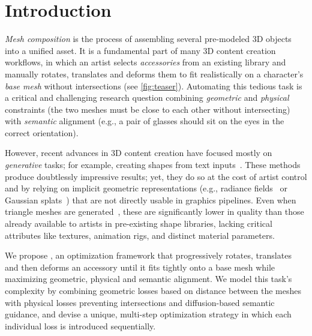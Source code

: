 \section{Introduction} \label{sec:introduction}

\emph{Mesh composition} is the process of assembling several pre-modeled 3D objects into a unified asset.
It is a fundamental part of many 3D content creation workflows, in which an artist selects \emph{accessories} from an existing library and manually rotates, translates and deforms them to fit realistically on a character's \emph{base mesh} without intersections (see \autoref{fig:teaser}).
Automating this tedious task is a critical and challenging research question combining \emph{geometric} and \emph{physical} constraints (the two meshes must be close to each other without intersecting) with \emph{semantic} alignment (e.g., a pair of glasses should sit on the eyes in the correct orientation).





However, recent advances in 3D content creation have focused mostly on \emph{generative} tasks; for example, creating shapes from text inputs~\cite{lin2023magic3d}.
These methods produce doubtlessly impressive results; yet, they do so at the cost of artist control and by relying on implicit geometric representations (e.g., radiance fields~\cite{mildenhall2021nerf} or Gaussian splats~\cite{kerbl20233d}) that are not directly usable in graphics pipelines.
Even when triangle meshes are generated~\cite{hao2024meshtron}, these are significantly lower in quality than those already available to artists in pre-existing shape libraries, lacking critical attributes like textures, animation rigs, and distinct material parameters. 







We propose \ourmethod{}, an optimization framework that progressively rotates, translates and then deforms an accessory until it fits tightly onto a base mesh while maximizing geometric, physical and semantic alignment.
We model this task's complexity by combining geometric losses based on distance between the meshes with physical losses preventing intersections and diffusion-based semantic guidance, and
devise a unique, multi-step optimization strategy in which each individual loss is introduced sequentially.

